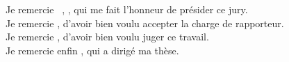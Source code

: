 \begin{acknowledgements}
\addchaptertocentry{\acknowledgementname} %
 \begin{spacing}{1.0} %
{%
	Je remercie \PRESp\ \PRESn, \PRESq, qui me fait l'honneur 
	de présider ce jury.\\[\baselineskip]
	
	Je remercie %
	\setcounter{III}{1}%
	, d'avoir bien voulu accepter la charge 
	de rapporteur.\\[\baselineskip]
	
	Je remercie %
	\setcounter{III}{1}%
	, d'avoir bien voulu juger ce travail.\\[\baselineskip]
	
	Je remercie enfin %
		\setcounter{III}{1}%
	, 
	qui  a dirigé ma thèse.\\[\baselineskip]
	
	\vfill
}
\end{spacing}
\end{acknowledgements}



